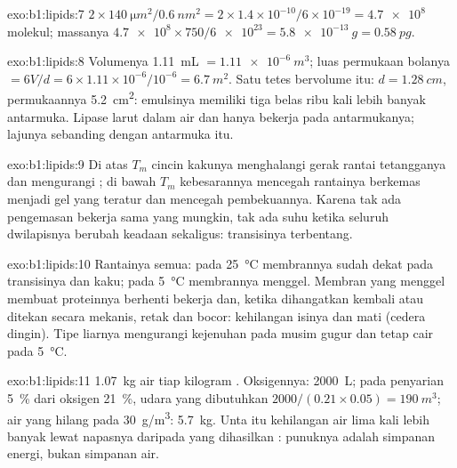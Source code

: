 \begin{solution}{exo:b1:lipids:7}
$2\times\qty{140}{\micro m^2}/\qty{0.6}{nm^2} = 2\times 1.4\times
10^{-10}/6\times 10^{-19} = \num{4.7e8}$ molekul; massanya
$\num{4.7e8}\times 750/\num{6e23} = \qty{5.8e-13}{g} = \qty{0.58}{pg}$.
\end{solution}

\begin{solution}{exo:b1:lipids:8}
Volumenya \qty{1.11}{mL} $= \qty{1.11e-6}{m^3}$; luas permukaan bolanya
$= 6V/d = 6\times 1.11\times 10^{-6}/10^{-6} = \qty{6.7}{m^2}$. Satu
tetes bervolume itu: $d = \qty{1.28}{cm}$, permukaannya
\qty{5.2}{cm^2}: emulsinya memiliki tiga belas ribu kali lebih banyak
antarmuka. Lipase larut dalam air dan hanya bekerja pada antarmukanya;
lajunya sebanding dengan antarmuka itu.
\end{solution}

\begin{solution}{exo:b1:lipids:9}
Di atas $T_m$ cincin kakunya menghalangi gerak rantai tetangganya dan
mengurangi ; di bawah $T_m$ kebesarannya mencegah rantainya
berkemas menjadi gel yang teratur dan mencegah pembekuannya. Karena tak
ada pengemasan bekerja sama yang mungkin, tak ada suhu ketika seluruh
dwilapisnya berubah keadaan sekaligus: transisinya terbentang.
\end{solution}

\begin{solution}{exo:b1:lipids:10}
Rantainya  semua: pada \qty{25}{\celsius} membrannya sudah dekat
pada transisinya dan kaku; pada \qty{5}{\celsius} membrannya menggel.
Membran yang menggel membuat proteinnya berhenti bekerja dan, ketika
dihangatkan kembali atau ditekan secara mekanis, retak dan bocor: 
kehilangan isinya dan  mati (cedera dingin). Tipe liarnya
mengurangi kejenuhan  pada musim gugur dan tetap cair pada
\qty{5}{\celsius}.
\end{solution}

\begin{solution}{exo:b1:lipids:11}
\qty{1.07}{kg} air tiap kilogram . Oksigennya: \qty{2000}{L}; pada
penyarian \qty{5}{\%} dari oksigen \qty{21}{\%}, udara yang dibutuhkan
$2000/(0.21\times 0.05) = \qty{190}{m^3}$; air yang hilang pada
\qty{30}{g/m^3}: \qty{5.7}{kg}. Unta itu kehilangan air lima kali lebih
banyak lewat napasnya daripada yang dihasilkan : punuknya adalah
simpanan energi, bukan simpanan air.
\end{solution}

